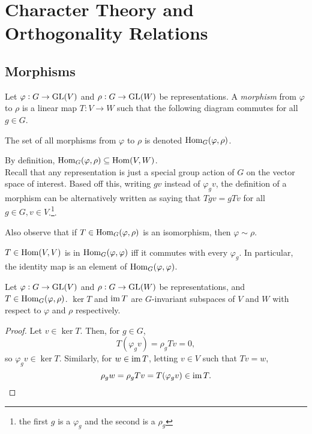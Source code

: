 
\section{Character Theory and Orthogonality Relations}

	\subsection{Morphisms}

		\begin{fdef}[Morphism]
			Let $\varphi : G \to \operatorname{GL}(V)$ and $\rho : G \to \operatorname{GL}(W)$ be representations. A \emph{morphism} from $\varphi$ to $\rho$ is a linear map $T : V \to W$ such that the following diagram commutes for all $g \in G$.
			\begin{center}
			\end{center}
			The set of all morphisms from $\varphi$ to $\rho$ is denoted $\operatorname{Hom}_G(\varphi,\rho)$.
		\end{fdef}

		By definition, $\operatorname{Hom}_G(\varphi,\rho) \subseteq \operatorname{Hom}(V,W)$.\\

		Recall that any representation is just a special group action of $G$ on the vector space of interest. Based off this, writing $gv$ instead of $\varphi_g v$, the definition of a morphism can be alternatively written as saying that $Tgv = gTv$ for all $g\in G, v \in V$.\footnote{the first $g$ is a $\varphi_g$ and the second is a $\rho_g$}.

		Also observe that if $T \in \operatorname{Hom}_G(\varphi,\rho)$ is an isomorphism, then $\varphi \sim \rho$.

		\begin{remark}
			$T \in \operatorname{Hom}(V,V)$ is in $\operatorname{Hom}_G(\varphi,\varphi)$ iff it commutes with every $\varphi_g$. In particular, the identity map is an element of $\operatorname{Hom}_G(\varphi,\varphi)$.
		\end{remark}

		\begin{fprop}
			Let $\varphi : G \to \operatorname{GL}(V)$ and $\rho : G \to \operatorname{GL}(W)$ be representations, and $T \in \operatorname{Hom}_G(\varphi,\rho)$. $\ker T$ and $\operatorname{im} T$ are $G$-invariant subspaces of $V$ and $W$ with respect to $\varphi$ and $\rho$ respectively.
		\end{fprop}
		\begin{proof}
			Let $v \in \ker T$. Then, for $g \in G$,
			\[ T (\varphi_g v) = \rho_g T v = 0,  \]
			so $\varphi_g v \in \ker T$. Similarly, for $w \in \operatorname{im} T$, letting $v \in V$ such that $Tv = w$, 
			\[ \rho_g w = \rho_g T v = T (\varphi_g v) \in \operatorname{im} T. \qedhere \]
		\end{proof}

